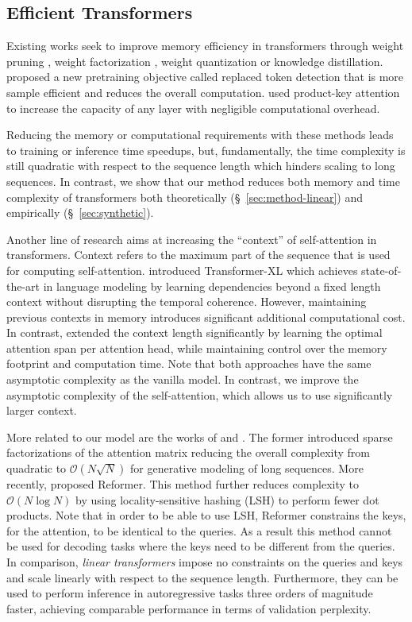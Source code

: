 \documentclass{article}
\newcommand{\linears}{\emph{linear transformers}}
\newcommand{\bigO}[1]{\mathcal{O}\left(#1\right)}
\begin{document}
\subsection{Efficient Transformers}

Existing works seek to improve memory efficiency in transformers through weight
pruning \cite{paul19}, weight factorization \cite{Lan2020}, weight quantization
\cite{zafrir19} or knowledge distillation. \citet{clark2020electra} proposed a
new pretraining objective called replaced token detection that is more sample
efficient and reduces the overall computation. \citet{lample19} used
product-key attention to increase the capacity of any layer with negligible
computational overhead.

Reducing the memory or computational requirements with these methods leads to
training or inference time speedups, but, fundamentally, the time complexity is
still quadratic with respect to the sequence length which hinders scaling to
long sequences. In contrast, we show that our method reduces both memory
and time complexity of transformers both theoretically
(\S~\ref{sec:method-linear}) and empirically (\S~\ref{sec:synthetic}).

Another line of research aims at increasing the ``context'' of self-attention
in transformers. Context refers to the maximum part of the sequence that is
used for computing self-attention. \citet{dai-etal-2019-transformer} introduced
Transformer-XL which achieves state-of-the-art in language modeling by learning
dependencies beyond a fixed length context without disrupting the temporal
coherence. However, maintaining previous contexts in memory introduces
significant additional computational cost. In contrast,
\citet{sukhbaatar-etal-2019} extended the context length significantly by
learning the optimal attention span per attention head, while maintaining
control over the memory footprint and computation time. Note that both
approaches have the same asymptotic complexity as the vanilla model. In
contrast, we improve the asymptotic complexity of the self-attention, which
allows us to use significantly larger context.

More related to our model are the works of \citet{child2019generating} and
\citet{kitaev2020reformer}. The former \cite{child2019generating} introduced
sparse factorizations of the attention matrix reducing the overall complexity
from quadratic to $\bigO{N\sqrt{N}}$ for generative modeling of long sequences.
More recently, \citet{kitaev2020reformer} proposed Reformer. This method
further reduces complexity to $\bigO{N \log{N}}$ by using locality-sensitive
hashing (LSH) to perform fewer dot products. Note that in order to be able to
use LSH, Reformer constrains the keys, for the attention, to be identical to
the queries. As a result this method cannot be used for decoding tasks where
the keys need to be different from the queries. In comparison, \linears{}
impose no constraints on the queries and keys and scale linearly
with respect to the sequence length. Furthermore, they can be used to perform
inference in autoregressive tasks three orders of magnitude faster, achieving
comparable performance in terms of validation perplexity.
\end{document}
